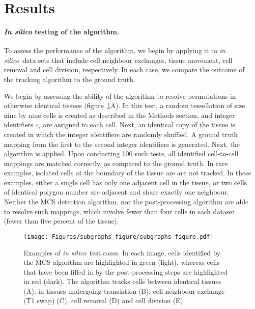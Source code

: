 \documentclass[a4paper,11pt]{article}
\newcommand{\insilico}{\textit{in silico}~}
\begin{document}

\section{Results} \label{sec:results}

\paragraph{\textit{In silico} testing of the algorithm.}

To assess the performance of the algorithm, we begin by applying it to \insilico data sets that include cell neighbour exchanges, tissue movement, cell removal and cell division, respectively. In each case, we compare the outcome of the tracking algorithm to the ground truth.

We begin by assessing the ability of the algorithm to resolve permutations in otherwise identical tissues (figure~\ref{fig:mcs}A). 
In this test, a random tessellation of size nine by nine cells is created as described in the Methods section, and integer identifiers $c_i$ are assigned to each cell.
Next, an identical copy of the tissue is created in which the integer identifiers are randomly shuffled. A ground truth mapping from the first to the second integer identifiers is generated. Next, the algorithm is applied. 
Upon conducting 100 such tests, all identified cell-to-cell mappings are matched correctly, as compared to the ground truth. 
In rare examples, isolated cells at the boundary of the tissue are are not tracked. In these examples, either a single cell has only one adjacent cell in the tissue, or two cells of identical polygon number are adjacent and share exactly one neighbour. 
Neither the MCS detection algorithm, nor the post-processing algorithm are able to resolve such mappings, which involve fewer than four cells in each dataset (fewer than five percent of the tissue). 


\begin{figure}[h]
\centering
\texttt{[image: Figures/subgraphs\_figure/subgraphs\_figure.pdf]}
\caption{Examples of \insilico test cases. 
In each image, cells identified by the MCS algorithm are highlighted in green (light), whereas cells that have been filled in by the post-processing steps are highlighted in red (dark). 
The algorithm tracks cells between identical tissues (A), in tissues undergoing translation (B), cell neighbour exchange (T1 swap) (C), cell removal (D) and cell division (E).}
\label{fig:mcs}
\end{figure}
\end{document}
